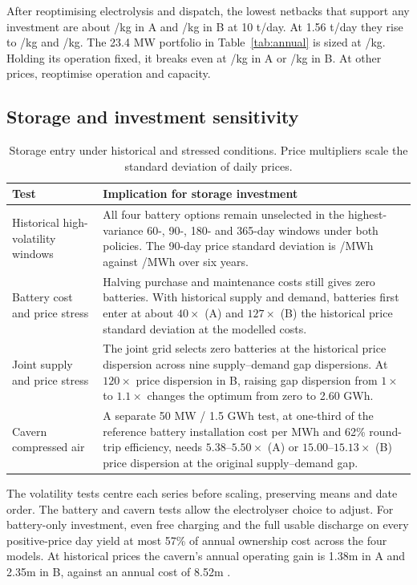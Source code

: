 \newpage
\noindent
After reoptimising electrolysis and dispatch, the lowest netbacks that
support any investment are about /kg in A and /kg in B
at 10 t/day. At 1.56 t/day they rise to /kg and /kg.
The 23.4 MW portfolio in Table~\ref{tab:annual} is sized at /kg.
Holding its operation fixed, it breaks even at /kg in A or
/kg in B. At other prices, reoptimise operation and capacity.

\subsection{Storage and investment sensitivity}\label{sec:storage1}
\begin{table}[H]
\centering\small
\caption{Storage entry under historical and stressed conditions.
Price multipliers scale the standard deviation of daily prices.}
\label{tab:storage}
\begin{tabularx}{\linewidth}{@{}P{.35\linewidth}Y@{}}
\toprule
Test & Implication for storage investment \\
\midrule
Historical high-volatility windows &
All four battery options remain unselected in the highest-variance
60-, 90-, 180- and 365-day windows under both policies. The 90-day price
standard deviation is /MWh against /MWh over six years. \\
Battery cost and price stress &
Halving purchase and maintenance costs still gives zero batteries.
With historical supply and demand, batteries first enter at about
\(40\times\) (A) and \(127\times\) (B) the historical price standard
deviation at the modelled costs. \\
Joint supply and price stress &
The joint grid selects zero batteries at the historical price dispersion
across nine supply--demand gap dispersions. At \(120\times\) price
dispersion in B, raising gap dispersion from \(1\times\) to \(1.1\times\)
changes the optimum from zero to 2.60 GWh. \\
Cavern compressed air &
A separate 50 MW / 1.5 GWh test, at one-third of the reference battery
installation cost per MWh and 62\% round-trip efficiency, needs
\(5.38\)--\(5.50\times\) (A) or \(15.00\)--\(15.13\times\) (B) price
dispersion at the original supply--demand gap. \\
\bottomrule
\end{tabularx}
\end{table}
The volatility tests centre each series before scaling, preserving
means and date order. The battery and cavern tests allow the electrolyser
choice to adjust. For battery-only investment, even free charging and
the full usable discharge on every positive-price day yield at most
57\% of annual ownership cost across the four models. At historical
prices the cavern's annual operating
gain is \gbp 1.38m in A and \gbp 2.35m in B, against an annual cost of
\gbp 8.52m \cite{stress}.

